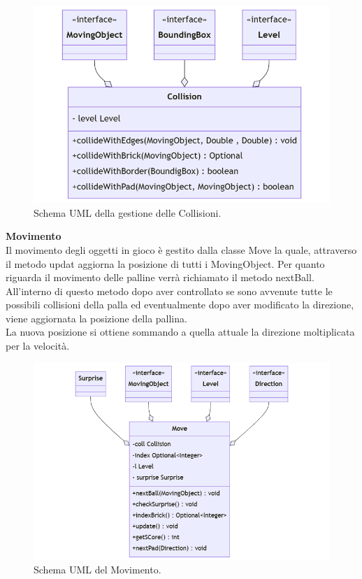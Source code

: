 \documentclass[a4paper,12pt]{report}
\begin{document}
\begin{figure}[H]
    \centering{}
    \includegraphics[scale=0.4]{images/Collision.png}
    \caption{Schema UML della gestione delle Collisioni.}
    \label{images:Collision}
\end{figure}
\pagebreak
\textbf{Movimento}\\
Il movimento degli oggetti in gioco è gestito dalla classe Move la quale,
attraverso il metodo updat aggiorna la posizione di tutti i MovingObject.
Per quanto riguarda il movimento delle palline verrà richiamato il metodo nextBall.
\\All'interno di questo metodo dopo aver controllato se sono avvenute tutte le possibili collisioni della palla ed eventualmente dopo aver modificato la direzione, viene aggiornata la posizione della pallina.
\\La nuova posizione si ottiene sommando a quella attuale la direzione moltiplicata per la velocità.
\begin{figure}[H]
    \centering{}
    \includegraphics[scale=0.6]{images/Move.png}
    \caption{Schema UML del Movimento.}
    \label{images:Move}
\end{figure}
\end{document}

